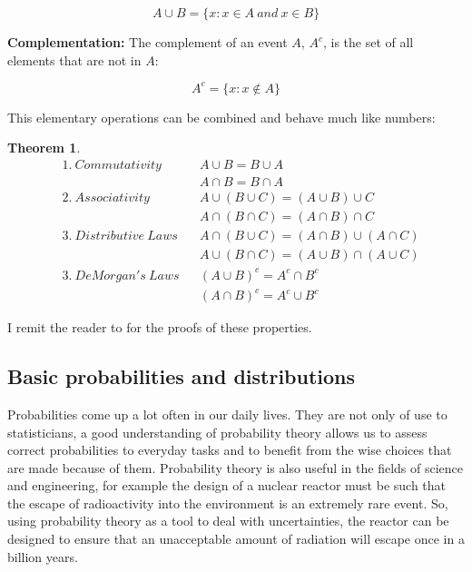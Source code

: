 \documentclass[
  oneside,
  11pt, a4paper,
  footinclude=true,
  headinclude=true,
  cleardoublepage=empty
]{scrbook}
\theoremstyle{definition}
\theoremstyle{definition}
\newtheorem{theorem}{Theorem}[section]
\begin{document}
            \begin{equation}
                A \cup B = \{x : x \in A\ and\ x \in B\}
            \end{equation}{}
            
            \textbf{Complementation:} The complement of an event $A$, $A^c$, is the set of all elements that are not in $A$:
            
            \begin{equation}
                A^c = \{x : x \notin A \}
            \end{equation}{}
            
            This elementary operations can be combined and behave much like numbers:
            
            \begin{theorem}{}
            \begin{align*}
                &1.\ Commutativity && A \cup B = B \cup A \\
                &                  && A \cap B = B \cap A \\
                &2.\ Associativity && A \cup (B \cup C) = (A \cup B) \cup C \\
                &                  && A \cap (B \cap C) = (A \cap B) \cap C \\
                &3.\ Distributive\ Laws && A \cap (B \cup C) = (A \cap B) \cup (A \cap C) \\
                &                       && A \cup (B \cap C) = (A \cup B) \cap (A \cup C) \\
                &3.\ DeMorgan's\ Laws && (A \cup B)^c = A^c \cap B^c \\
                &                     && (A \cap B)^c = A^c \cup B^c
            \end{align*}{}
            \end{theorem}
            
            I remit the reader to \cite{CaseBerg:01} for the proofs of these properties.
        
        \subsection{Basic probabilities and distributions}
        
            Probabilities come up a lot often in our daily lives. They are not only of use to statisticians, a good understanding of probability theory allows us to assess correct probabilities to everyday tasks and to benefit from the wise choices that are made because of them. Probability theory is also useful in the fields of science and engineering, for example the design of a nuclear reactor must be such that the escape of radioactivity into the environment is an extremely rare event. So, using probability theory as a tool to deal with uncertainties, the reactor can be designed to ensure that an unacceptable amount of radiation will escape once in a billion years.
            
\end{document}
